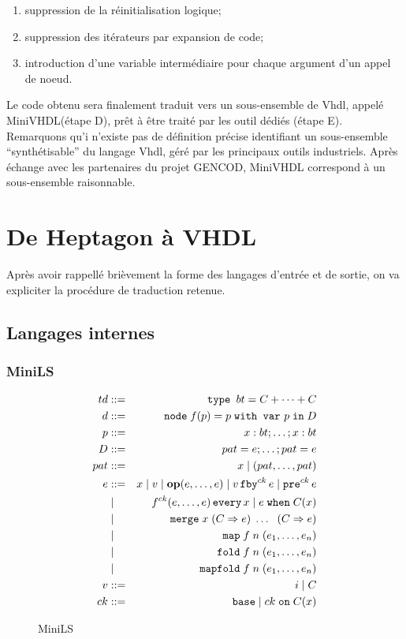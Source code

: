 \documentclass[a4paper]{article}
\newcommand{\LANG}{{\sc Heptagon}}
\newcommand{\minivhdl}{{\sc MiniVHDL}}
\newcommand{\vhdl}{{\sc Vhdl}}
\newcommand{\p}[0]{\; \vert \;}
\newcommand{\mybox}[1]{\mbox{\tt{#1}}}
\newcommand{\Coloneqq}[0]{::=}
\newcommand{\Node}[4]{\mybox{node} \; f(#1) = #2 \; \mybox{with var} \
  #3 \; \mybox{in} \; #4}
\newcommand{\Op}[2]{\mybox{\bf{op}}(#1,\dots,#2)}
\newcommand{\Fby}[2]{#1 \, \mybox{fby}^{ck} \, #2}
\newcommand{\Pre}[1]{\mybox{pre}^{ck} \, #1}
\newcommand{\Every}[4]{#1^{ck}(#2,\dots,#3) \, \mybox{every} \, #4}
\newcommand{\When}[3]{#1 \; \mybox{when} \; #2(#3)}
\newcommand{\Merge}[5]{\mybox{merge} \; #1 \; (#2 \Rightarrow #3) \; \dots \; \
  (#4 \Rightarrow #5)}
\newcommand{\Base}[0]{\mybox{base}}
\newcommand{\On}[3]{#1 \; \mybox{on} \; #2 (#3)}
\newcommand{\Map}[3]{\mathtt{map} \; #1\; n\; (#2,\dots,#3)}
\newcommand{\Fold}[3]{\mathtt{fold} \; #1\; n\; (#2,\dots,#3)}
\newcommand{\Mapfold}[3]{\mathtt{mapfold} \; #1\; n\; (#2,\dots,#3)}
\begin{document}
\begin{enumerate}
\item suppression de la r\'einitialisation logique;
\item suppression des it\'erateurs par expansion de code;
\item introduction d'une variable interm\'ediaire pour chaque argument d'un appel
  de noeud.
\end{enumerate}

Le code obtenu sera finalement traduit vers un sous-ensemble de \vhdl, appel\'e
\minivhdl (\'etape D), pr\^et \`a \^etre trait\'e par les outil d\'edi\'es (\'etape E). Remarquons
qu'i n'existe pas de d\'efinition pr\'ecise identifiant un sous-ensemble
``synth\'etisable'' du langage \vhdl, g\'er\'e par les principaux outils
industriels. Apr\`es \'echange avec les partenaires du projet GENCOD,
\minivhdl{} correspond \`a un sous-ensemble raisonnable.


\section{De \LANG{} \`a VHDL}
Apr\`es avoir rappell\'e bri\`evement la forme des langages d'entr\'ee et de sortie, on
va expliciter la proc\'edure de traduction retenue.

\subsection{Langages internes}

\subsubsection{MiniLS}
\label{sec:syn:mls}

\begin{figure}[h]
  \centering
  \begin{eqnarray*}
    td & \Coloneqq & \mybox{type } bt = C + \dots + C \\
    d & \Coloneqq & \Node{p}{p}{p}{D} \\
    p & \Coloneqq & x : bt; \dots; x : bt \\
    D & \Coloneqq & pat = e; \dots; pat = e \\
    pat & \Coloneqq & x \p (pat,\dots,pat) \\
    e & \Coloneqq & x \p v \p \Op{e}{e} \p \Fby{v}{e} \p \Pre{e} \\
    & \p & \Every{f}{e}{e}{x} \p \When{e}{C}{x} \\
    & \p & \Merge{x}{C}{e}{C}{e} \\
    & \p & \Map{f}{e_1}{e_n} \\
    & \p & \Fold{f}{e_1}{e_n} \\
    & \p & \Mapfold{f}{e_1}{e_n} \\
    v & \Coloneqq & i \p C \\
    ck & \Coloneqq & \Base \p \On{ck}{C}{x}
  \end{eqnarray*}
  \caption{MiniLS}
  \label{fig:mls}
\end{figure}
\end{document}
